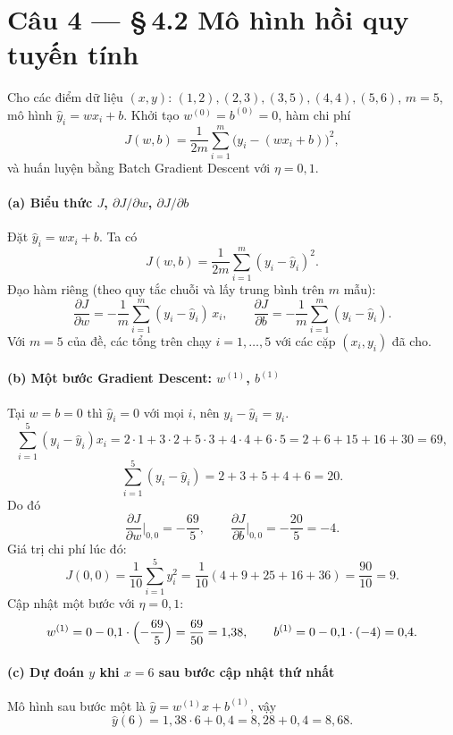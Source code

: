 \section*{Câu 4 --- §\,4.2 Mô hình hồi quy tuyến tính}

Cho các điểm dữ liệu $(x,y)$: $(1,2),(2,3),(3,5),(4,4),(5,6)$, $m=5$, mô hình $\hat y_i=w x_i+b$.
Khởi tạo $w^{(0)}=b^{(0)}=0$, hàm chi phí
\[
J(w,b)=\frac{1}{2m}\sum_{i=1}^m \bigl(y_i-(w x_i+b)\bigr)^2,
\]
và huấn luyện bằng Batch Gradient Descent với $\eta=0{,}1$.

\paragraph{(a) Biểu thức $J$, $\partial J/\partial w$, $\partial J/\partial b$}

Đặt $\hat y_i=w x_i+b$. Ta có
\[
J(w,b)=\frac{1}{2m}\sum_{i=1}^m (y_i-\hat y_i)^2.
\]
Đạo hàm riêng (theo quy tắc chuỗi và lấy trung bình trên $m$ mẫu):
\[
\frac{\partial J}{\partial w}
=-\frac{1}{m}\sum_{i=1}^m (y_i-\hat y_i)\,x_i,\qquad
\frac{\partial J}{\partial b}
=-\frac{1}{m}\sum_{i=1}^m (y_i-\hat y_i).
\]
Với $m=5$ của đề, các tổng trên chạy $i=1,\ldots,5$ với các cặp $(x_i,y_i)$ đã cho.

\paragraph{(b) Một bước Gradient Descent: $w^{(1)}$, $b^{(1)}$}

Tại $w=b=0$ thì $\hat y_i=0$ với mọi $i$, nên $y_i-\hat y_i=y_i$.
\[
\sum_{i=1}^5 (y_i-\hat y_i)x_i
=2\cdot 1+3\cdot 2+5\cdot 3+4\cdot 4+6\cdot 5
=2+6+15+16+30=69,
\]
\[
\sum_{i=1}^5 (y_i-\hat y_i)=2+3+5+4+6=20.
\]
Do đó
\[
\frac{\partial J}{\partial w}\Big|_{0,0}=-\frac{69}{5},\qquad
\frac{\partial J}{\partial b}\Big|_{0,0}=-\frac{20}{5}=-4.
\]
Giá trị chi phí lúc đó:
\[
J(0,0)=\frac{1}{10}\sum_{i=1}^5 y_i^2
=\frac{1}{10}(4+9+25+16+36)=\frac{90}{10}=9.
\]
Cập nhật một bước với $\eta=0{,}1$:
\[
w^{(1)}=0-0{,}1\cdot\Bigl(-\frac{69}{5}\Bigr)=\frac{69}{50}=1{,}38,\qquad
b^{(1)}=0-0{,}1\cdot(-4)=0{,}4.
\]

\paragraph{(c) Dự đoán $y$ khi $x=6$ sau bước cập nhật thứ nhất}

Mô hình sau bước một là $\hat y=w^{(1)}x+b^{(1)}$, vậy
\[
\hat y(6)=1{,}38\cdot 6+0{,}4=8{,}28+0{,}4=8{,}68.
\]
